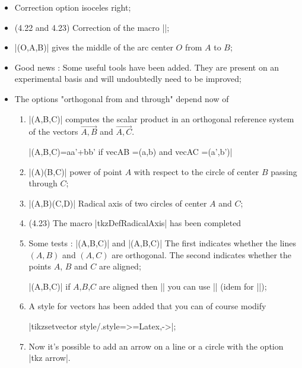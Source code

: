 \begin{itemize}
\item Correction option isoceles right;

\item (4.22 and 4.23) Correction of the macro |\tkzMarkAngle|;


\item |\tkzDefMidArc(O,A,B)| gives the middle of the arc center $O$ from $A$ to $B$; 

\item Good news : Some useful tools have been added. They are present on an experimental basis and will undoubtedly need to be improved;


\item The options "orthogonal from and through" depend now of 

\begin{enumerate}
  
  \item |\tkzDotProduct(A,B,C)| computes the scalar product in an orthogonal reference system of the vectors $\overrightarrow{A,B}$ and $\overrightarrow{A,C}$. 
  
  |\tkzDotProduct(A,B,C)=aa'+bb' if vec{AB} =(a,b) and vec{AC} =(a',b')|
  
  
  \item |\tkzPowerCircle(A)(B,C)| power of point $A$ with respect to the circle of center $B$ passing through $C$;
  
  
  \item |\tkzDefRadicalAxis(A,B)(C,D)| Radical axis of two circles of center $A$ and $C$;


\item (4.23) The macro |tkzDefRadicalAxis| has been completed
  
  \item Some tests : |\tkzIsOrtho(A,B,C)| and |\tkzIsLinear(A,B,C)| The first indicates whether the lines $(A,B)$ and $(A,C)$ are orthogonal. The second indicates whether the points $A$, $B$ and $C$ are aligned;

 |\tkzIsLinear(A,B,C)| if $A$,$B$,$C$ are aligned then |\tkzLineartrue|
  you can use |\iftkzLinear| (idem for |\tkzIsOrtho|);

\item A style for vectors has been added that you can of course modify

|tikzset{vector style/.style={>=Latex,->}}|;


\item Now it's possible to add an arrow on a line or a circle with the option |tkz arrow|. 
\end{enumerate}
\end{itemize}

